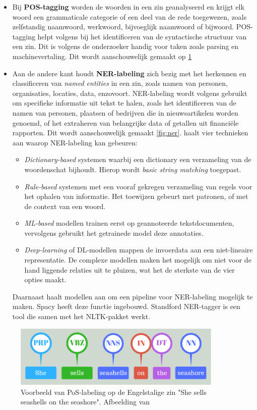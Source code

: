 \begin{itemize}
	\item Bij \textbf{POS-tagging} worden de woorden in een zin geanalyseerd en krijgt elk woord een grammaticale categorie of een deel van de rede toegewezen, zoals zelfstandig naamwoord, werkwoord, bijvoeglijk naamwoord of bijwoord. POS-tagging helpt volgens \textcite{Jurafsky2014} bij het identificeren van de syntactische structuur van een zin. Dit is volgens de onderzoeker handig voor taken zoals parsing en machinevertaling. Dit wordt aanschouwelijk gemaakt op \ref{fig:pos}
	\item Aan de andere kant houdt \textbf{NER-labeling} zich bezig met het herkennen en classificeren van \textit{named entities} in een zin, zoals namen van personen, organisaties, locaties, data, enzovoort. NER-labeling wordt volgens \textcite{Jurafsky2014} gebruikt om specifieke informatie uit tekst te halen, zoals het identificeren van de namen van personen, plaatsen of bedrijven die in nieuwsartikelen worden genoemd, of het extraheren van belangrijke data of getallen uit financiële rapporten. Dit wordt aanschouwelijk gemaakt \ref{fig:ner}. \textcite{Li2018} haalt vier technieken aan waarop NER-labeling kan gebeuren:
	\begin{itemize}
		\item \textit{Dictionary-based} systemen waarbij een dictionary een verzameling van de woordenschat bijhoudt. Hierop wordt \textit{basic string matching} toegepast.
		\item \textit{Rule-based} systemen met een vooraf gekregen verzameling van regels voor het ophalen van informatie. Het toewijzen gebeurt met patronen, of met de context van een woord.
		\item \textit{ML-based} modellen trainen eerst op geannoteerde tekstdocumenten, vervolgens gebruikt het getrainede model deze annotaties.
		\item \textit{Deep-learning} of DL-modellen mappen de invoerdata aan een niet-lineaire representatie. De complexe modellen maken het mogelijk om niet voor de hand liggende relaties uit te pluizen, wat het de sterkste van de vier opties maakt.
	\end{itemize}
	Daarnaast haalt \textcite{Li2018} modellen aan om een pipeline voor NER-labeling mogelijk te maken. Spacy heeft deze functie ingebouwd. Standford NER-tagger is een tool die samen met het NLTK-pakket werkt.
\end{itemize}

\begin{figure}
	\begin{center}
		\includegraphics[width=10cm]{img/poslabeling.png}
	\end{center}
	\caption{Voorbeeld van PoS-labeling op de Engelstalige zin "She sells seashells on the seashore". Afbeelding van \textcite{Bilisci2021} }
	\label{fig:pos}
\end{figure}

